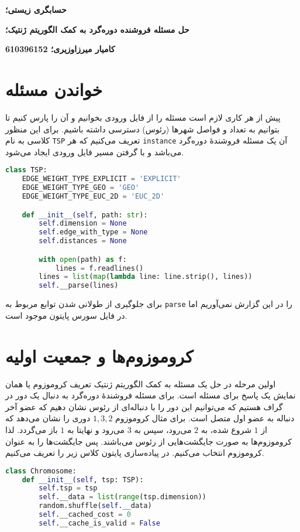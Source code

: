 \documentclass[a4paper, 12pt]{article}
\theoremstyle{definition}
\begin{document}
\textbf{حسابگری زیستی؛}

\textbf{حل مسئله فروشنده دوره‌گرد به کمک الگوریتم ژنتیک؛}

\textbf{کامیار میرزاوزیری؛ 610396152}

\hrulefill

\section{خواندن مسئله}

پیش از هر کاری لازم است مسئله را از فایل ورودی بخوانیم و آن را پارس کنیم تا بتوانیم به تعداد و فواصل شهرها (رئوس) دسترسی داشته باشیم. برای این منظور کلاسی به نام
\texttt{TSP}
تعریف می‌کنیم که هر
\texttt{instance}
آن یک مسئله فروشندهٔ دوره‌گرد می‌باشد و با گرفتن مسیر فایل ورودی ایجاد می‌شود.

\LTR
\begin{lstlisting}[language=Python]
class TSP:
    EDGE_WEIGHT_TYPE_EXPLICIT = 'EXPLICIT'
    EDGE_WEIGHT_TYPE_GEO = 'GEO'
    EDGE_WEIGHT_TYPE_EUC_2D = 'EUC_2D'

    def __init__(self, path: str):
        self.dimension = None
        self.edge_with_type = None
        self.distances = None

        with open(path) as f:
            lines = f.readlines()
        lines = list(map(lambda line: line.strip(), lines))
        self.__parse(lines)
\end{lstlisting}
\RTL

برای جلوگیری از طولانی شدن توابع مربوط به
\texttt{parse}
را در این گزارش نمی‌آوریم اما در فایل سورس پایتون موجود است.

\section{کروموزوم‌ها و جمعیت اولیه}

اولین مرحله در حل یک مسئله به کمک الگوریتم ژنتیک تعریف کروموزوم یا همان نمایش یک پاسخ برای مسئله است. برای مسئله فروشندهٔ دوره‌گرد به دنبال یک دور در گراف هستیم که می‌توانیم این دور را با دنباله‌ای از رئوس نشان دهیم که عضو آخر دنباله به عضو اول متصل است. برای مثال کروموزوم
$1, 3, 2$
دوری را نشان می‌دهد که از
$1$
شروع شده، به
$2$
می‌رود، سپس به
$3$
می‌رود و نهایتا به
$1$
باز می‌گردد. لذا کروموزوم‌ها به صورت جایگشت‌هایی از رئوس می‌باشند. پس جایگشت‌ها را به عنوان کروموزوم انتخاب می‌کنیم. در پیاده‌سازی پایتون کلاس زیر را تعریف می‌کنیم.

\LTR
\begin{lstlisting}[language=Python]
class Chromosome:
    def __init__(self, tsp: TSP):
        self.tsp = tsp
        self.__data = list(range(tsp.dimension))
        random.shuffle(self.__data)
        self.__cached_cost = 0
        self.__cache_is_valid = False
\end{lstlisting}
\RTL
\end{document}
